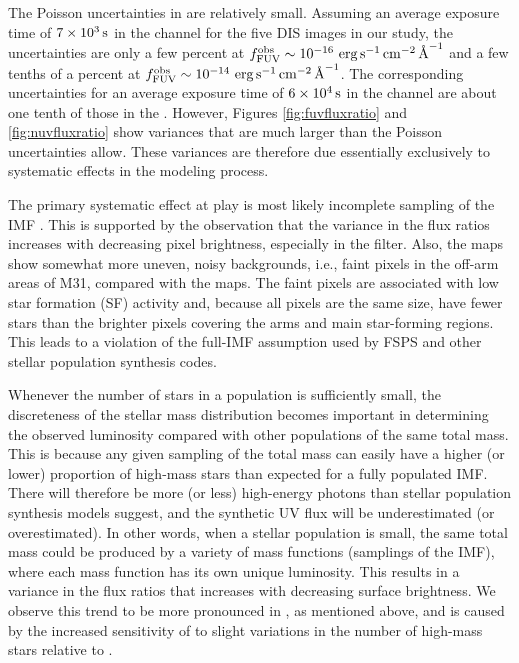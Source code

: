 \documentclass[iop, tighten]{emulateapj}
\begin{document}
The Poisson uncertainties in \fxobs{} are relatively small. Assuming an average
exposure time of $7\times 10^3\,\mathrm{s}$ in the \fuv{} channel for the five DIS
images in our study, the uncertainties are only a few percent at $f_{\mathrm{FUV}}^{\mathrm{obs}} \sim
10^{-16}\, \,\mathrm{erg}\,\mathrm{s}^{-1}\,\mathrm{cm}^{-2}\,\textrm{\AA}^{-1}$ and a few tenths of a percent at $f_{\mathrm{FUV}}^{\mathrm{obs}} \sim
10^{-14}\, \,\mathrm{erg}\,\mathrm{s}^{-1}\,\mathrm{cm}^{-2}\,\textrm{\AA}^{-1}$. The corresponding \nuv{} uncertainties for an average
exposure time of $6\times 10^4\,\mathrm{s}$ in the \nuv{} channel are about one tenth
of those in the \fuv{}. However, Figures \ref{fig:fuvfluxratio} and
\ref{fig:nuvfluxratio} show variances that are much larger than the Poisson
uncertainties allow. These variances are therefore due essentially exclusively
to systematic effects in the modeling process.

The primary systematic effect at play is most likely incomplete sampling of the
IMF \citep{Elmegreen:1999, Bastian:2010, Fumagalli:2011, daSilva:2012,
daSilva:2014}. This is supported by the observation that the variance in the
flux ratios increases with decreasing pixel brightness, especially in the
\fuv{} filter. Also, the \fxsfh{} maps show somewhat more uneven, noisy
backgrounds, i.e., faint pixels in the off-arm areas of M31, compared with the
\fxobs{} maps. The faint pixels are associated with low star formation (SF)
activity and, because all pixels are the same size, have fewer stars than the
brighter pixels covering the arms and main star-forming regions. This leads to
a violation of the full-IMF assumption used by FSPS and other stellar
population synthesis codes.

Whenever the number of stars in a population is sufficiently small, the
discreteness of the stellar mass distribution becomes important in determining
the observed luminosity compared with other populations of the same total mass.
This is because any given sampling of the total mass can easily have a higher
(or lower) proportion of high-mass stars than expected for a fully populated
IMF. There will therefore be more (or less) high-energy photons than stellar
population synthesis models suggest, and the synthetic UV flux will be
underestimated (or overestimated). In other words, when a stellar population is
small, the same total mass could be produced by a variety of mass functions
(samplings of the IMF), where each mass function has its own unique luminosity.
This results in a variance in the flux ratios that increases with decreasing
surface brightness. We observe this trend to be more pronounced in \fuv{}, as
mentioned above, and is caused by the increased sensitivity of \ffuvobs{} to
slight variations in the number of high-mass stars relative to \fnuvobs{}.
\end{document}
